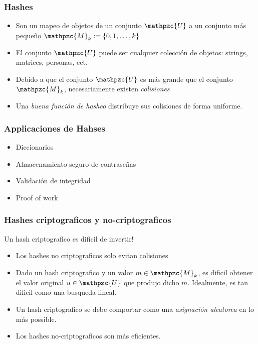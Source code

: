 \documentclass{beamer}
\begin{document}
\begin{frame}
    \frametitle{Hashes}
    \begin{itemize}
        \item{Son un mapeo de objetos de un conjunto $\mathpzc{U}$
        a un conjunto m\'as peque\~no $\mathpzc{M}_{k}:=\{0,1,\dots,k\}$}
        \item{El conjunto $\mathpzc{U}$ puede ser cualquier colecci\'on de
        objetos: strings, matrices, personas, ect.}
        \item{Debido a que el conjunto $\mathpzc{U}$ es m\'as grande que
        el conjunto $\mathpzc{M}_k$, necesariamente existen \emph{colisiones}}
        \item{Una \emph{buena funci\'on de hasheo} distribuye sus colisiones
        de forma uniforme.}
    \end{itemize}
\end{frame}

\begin{frame}
    \frametitle{Applicaciones de Hahses}
    \begin{itemize}
        \item{Diccionarios}
        \item{Almacenamiento seguro de contrase\~nas}
        \item{Validaci\'on de integridad}
        \item{Proof of work}
    \end{itemize}
\end{frame}

\begin{frame}
    \frametitle{Hashes criptograficos y no-criptograficos}
    Un hash criptografico es dificil de invertir!
    \begin{itemize}
        \item{Los hashes no criptograficos solo evitan colisiones}
        \item{Dado un hash criptografico y un valor $m\in\mathpzc{M}_k$,
        es dificil obtener el valor original $u\in\mathpzc{U}$ que produjo
        dicho $m$. Idealmente, es tan dificil como una busqueda lineal.}
        \item{Un hash criptografico se debe comportar como una \emph{asignaci\'on aleatorea}
        en lo m\'as possible.}
        \item{Los hashes no-criptograficos son m\'as eficientes.}
    \end{itemize}
\end{frame}
\end{document}

